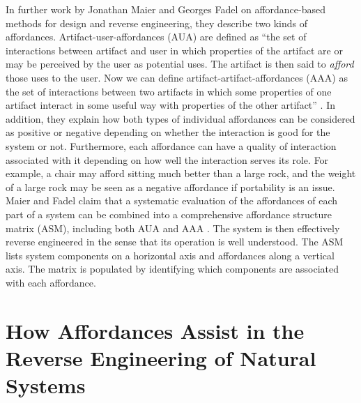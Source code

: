 In further work by Jonathan Maier and Georges Fadel on affordance-based
methods for design and reverse engineering, they describe two kinds of
affordances. Artifact-user-affordances (AUA) are defined as “the set of
interactions between artifact and user in which properties of the
artifact are or may be perceived by the user as potential uses. The
artifact is then said to \textit{afford} those uses to the user. Now we
can define artifact-artifact-affordances (AAA) as the set of
interactions between two artifacts in which some properties of one
artifact interact in some useful way with properties of the other
artifact” \citep{maierfadel2003}. In addition, they explain how both types %
of individual affordances can be considered as positive or negative
depending on whether the interaction is good for the system or not.
Furthermore, each affordance can have a quality of interaction
associated with it depending on how well the interaction serves its
role. For example, a chair may afford sitting much better than a large
rock, and the weight of a large rock may be seen as a negative
affordance if portability is an issue. Maier and Fadel claim that a
systematic evaluation of the affordances of each part of a system can
be combined into a comprehensive affordance structure matrix (ASM),
including both AUA and AAA \citep{maieretal2003, maieretal2008}. The system is then
effectively reverse engineered in the sense that its operation is well
understood. The ASM lists system components on a horizontal axis and
affordances along a vertical axis. The matrix is populated by
identifying which components are associated with each affordance.

\section[How Affordances Assist]{How Affordances Assist in the Reverse Engineering of Natural Systems}

